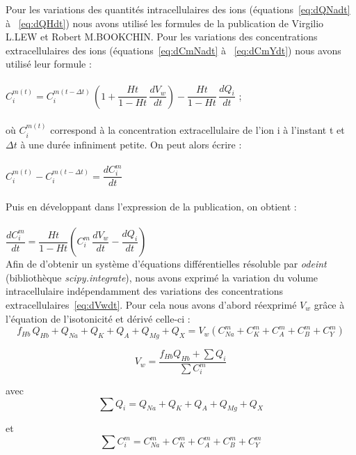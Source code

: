 \documentclass[a4paper,fleqn]{article}
\begin{document}
Pour les variations des quantités intracellulaires des ions (équations~\eqref{eq:dQNadt} à ~\eqref{eq:dQHdt}) nous avons utilisé les formules de la publication de Virgilio L.LEW et Robert M.BOOKCHIN. Pour les variations des concentrations extracellulaires des ions (équations~\eqref{eq:dCmNadt} à ~\eqref{eq:dCmYdt}) nous avons utilisé leur formule :\\
\\
$C_i^{m(t)}=C_i^{m(t-\Delta{t})}\,\left(1 + \dfrac{Ht}{1 - Ht}\,\dfrac{dV_w}{dt}\right) - \dfrac{Ht}{1 - Ht}\,\dfrac{dQ_{i}}{dt}$ ; \\
\\
où $C_i^{m(t)}$ correspond à la concentration extracellulaire de l'ion i à l'instant t et $\Delta{t}$ à une durée infiniment petite. On peut alors écrire :\\
\\
$C_i^{m(t)} - C_i^{m(t-\Delta{t})} = \dfrac{dC_{i}^m}{dt}$\\
\\
Puis en développant dans l'expression de la publication, on obtient :\\
\\
$\dfrac{dC_{i}^m}{dt}=\dfrac{Ht}{1 - Ht}\left(C_{i}^m\,\dfrac{dV_w}{dt}-\dfrac{dQ_{i}}{dt}\right)$
\\

Afin de  d'obtenir un système d'équations différentielles résoluble par \textit{odeint} (bibliothèque \textit{scipy.integrate}), nous avons exprimé la variation du volume intracellulaire indépendamment des variations des concentrations extracellulaires~\eqref{eq:dVwdt}. Pour cela nous avons d'abord réexprimé $V_w$ grâce à l'équation de l'isotonicité et dérivé celle-ci :\\

\begin{equation}
f_{Hb}\,Q_{Hb}+Q_{Na}+Q_K+Q_A+Q_{Mg}+Q_X=V_w\left(C_{Na}^m +C_{K}^m +C_{A}^m +C_{B}^m +C_{Y}^m\right)\label{eq:Volume}
\end{equation}

\begin{equation}
V_{w} = \dfrac{f_{Hb}Q_{Hb}+\sum Q_{i}}{\sum C_{i}^{m}}
\end{equation}

avec
\begin{equation}
\sum Q_{i} = Q_{Na}+Q_{K}+Q_{A}+Q_{Mg}+Q_{X} 
\end{equation}

et 
\begin{equation}
\sum C_{i}^m =C_{Na}^m +C_{K}^m +C_{A}^m +C_{B}^m +C_{Y}^m  
\end{equation}\\
\end{document}
